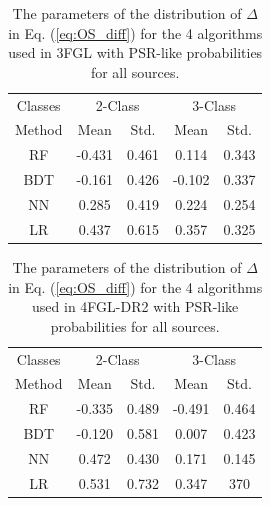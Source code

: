 \begin{table}[!h]
\tiny
\centering
\renewcommand{\tabcolsep}{1mm}
\renewcommand{\arraystretch}{1.3}

\begin{tabular}{c c c c c }
\hline
\hline
Classes&\multicolumn{2}{c}{2-Class}&\multicolumn{2}{c}{3-Class}\\
Method & Mean&Std.&Mean&Std.\\
\hline
RF& -0.431 & 0.461&0.114&0.343\\
\hline
BDT&-0.161&0.426 &-0.102&0.337\\
\hline
NN&0.285&0.419&0.224&0.254\\
\hline
LR&0.437&0.615&0.357&0.325\\
\end{tabular}
\vspace{2mm}
\caption{The parameters of the distribution of $\Delta$ in Eq.  (\ref{eq:OS_diff})
for the 4 algorithms used in 3FGL with PSR-like probabilities for all sources.
}
\label{tab:OvsS_3FGL}
\end{table}





\begin{table}[!h]
\tiny
\centering
\renewcommand{\tabcolsep}{1mm}
\renewcommand{\arraystretch}{1.3}

\begin{tabular}{c c c c c}
\hline
\hline
Classes&\multicolumn{2}{c}{2-Class}&\multicolumn{2}{c}{3-Class}\\
Method & Mean&Std.&Mean&Std.\\
\hline
RF& -0.335 & 0.489&-0.491&0.464\\
\hline
BDT&-0.120&0.581 &0.007&0.423\\
\hline
NN&0.472&0.430&0.171&0.145\\
\hline
LR&0.531&0.732&0.347&370\\
\end{tabular}
\vspace{2mm}
\caption{The parameters of the distribution of $\Delta$ in Eq.  (\ref{eq:OS_diff})
for the 4 algorithms used in 4FGL-DR2 with PSR-like probabilities for all sources.
}
\label{tab:OvsS_4FGL}
\end{table}

